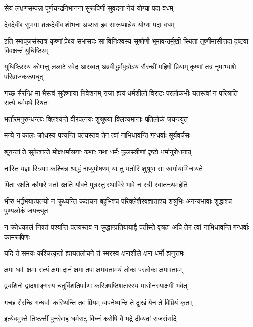 \twolineshloka
{सेयं लक्षणसम्पन्ना पूर्णचन्द्रनिभानना}
{सुरूपिणी सुवदना नेयं योग्या पदा वधम्}


\twolineshloka
{देवदेवीव सुभगा शक्रदेवीव शोभना}
{अप्सरा इव सारूप्यान्नेयं योग्या पदा वधम्}


\onelineshloka
{इति स्मापूजसंस्तत्र कृष्णां प्रेक्ष्य सभासदः}
\twolineshloka
{सा विनिःश्वस्य सुश्रोणी भूमावन्तर्मुखी स्थिता}
{तूष्णीमासीत्तदा दृष्ट्वा विवक्षन्तं युधिष्ठिरम्}


\threelineshloka
{युधिष्ठिरस्य कोपात्तु ललाटे स्वेद आस्रवत्}
{अब्रवीद्धर्मपुत्रोऽथ सैरन्ध्रीं महिषीं प्रियाम्}
{कृष्णां तत्र नृपाभ्याशे परिव्राजकरूपधृत्}


\threelineshloka
{गच्छ सैरन्ध्रि मा भैस्त्वं सुदेष्णाया निवेशनम्}
{राजा ह्ययं धर्मशीलो विराटः परलोकभीः}
{यतस्त्वां न परित्राति सत्ये धर्मपथे स्थितः}


\twolineshloka
{भर्तारमनुरुन्धन्त्यः क्लिश्यन्ते वीरपत्नयः}
{शुश्रूषया क्लिश्यमानाः पतिलोकं जयन्त्युत}


\twolineshloka
{मन्ये न कालः क्रोधस्य पश्यन्ति पतयस्तव}
{तेन त्वां नाभिधावन्ति गन्धर्वाः सूर्यवर्चसः}


\twolineshloka
{श्रूयन्तां ते सुकेशान्ते मोक्षधर्माश्रयाः कथाः}
{यथा धर्मः कुलस्त्रीणां दृष्टो धर्मानुरोधनात्}


\twolineshloka
{नास्ति यज्ञः स्त्रियाः कश्चिन्न श्राद्धं नाप्युपोषणम्}
{या तु भर्तारि शुश्रूषा सा स्वर्गायाभिजायते}


\twolineshloka
{पिता रक्षति कौमारे भर्ता रक्षति यौवने}
{पुत्रस्तु स्थाविरे भावे न स्त्री स्वातन्त्र्यमर्हति}


\threelineshloka
{भीरु भर्तृभयात्पत्न्यो न क्रुध्यन्ति कदाचन}
{बहुभिश्च परिक्लेशैरवज्ञाताश्च शत्रुभिः}
{अनन्यभावाः शुद्धाश्च पुण्यलोकं जयन्त्युत}


\threelineshloka
{न क्रोधकालं नियतं पश्यन्ति पतयस्तव}
{न क्रुद्धान्प्रतियायाद्वै पतींस्ते वृत्रहा अपि}
{तेन त्वां नाभिधावन्ति गन्धर्वाः कामरूपिणः}


\twolineshloka
{यदि ते समयः कश्चित्कृतो ह्यायतलोचने}
{तं स्मरस्व क्षमाशीले क्षमा धर्मो ह्यनुत्तमः}


\twolineshloka
{क्षमा धर्मः क्षमा सत्यं क्षमा दानं क्षमा तपः}
{क्षमावतामयं लोकः परलोकः क्षमावताम्म्}


\twolineshloka
{द्व्यंशिनो द्वादशाङ्गस्य चतुर्विंशतिपर्वणः}
{कस्त्रिषष्ठिशतारस्य मासोनस्याक्षमी भवेत्}


\twolineshloka
{गच्छ सैरन्ध्रि गन्धर्वाः करिष्यन्ति तव प्रियम्}
{व्यपनेष्यन्ति ते दुःखं येन ते विप्रियं कृतम्}


\twolineshloka
{इत्येवमुक्ते तिष्ठन्तीं पुनरेवाह धर्मराट्}
{विघ्नं करोषि वै भद्रे दीव्यतां राजसंसदि}


